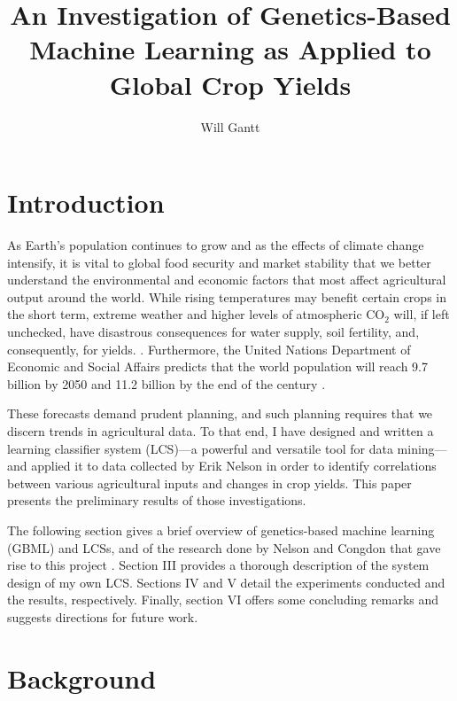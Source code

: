 \documentclass[11pt]{article}
\begin{document}
\title{An Investigation of Genetics-Based Machine Learning as Applied to Global Crop Yields}
\author{Will Gantt}
\maketitle

\section{Introduction}

As Earth's population continues to grow and as the effects of climate change intensify, it is vital to global food security and market stability that we better understand the environmental and economic factors that most affect agricultural output around the world. While rising temperatures may benefit certain crops in the short term, extreme weather and higher levels of atmospheric $\text{CO}_2$ will, if left unchecked,  have disastrous consequences for water supply, soil fertility, and, consequently, for yields. \cite{us_epa_climate_2017}. Furthermore, the United Nations Department of Economic and Social Affairs predicts that the world population will reach 9.7 billion by 2050 and 11.2 billion by the end of the century \cite{noauthor_world_2015}.

These forecasts demand prudent planning, and such planning requires that we discern trends in agricultural data. To that end, I have designed and written a learning classifier system (LCS)---a powerful and versatile tool  for data mining---and applied it to data collected by Erik Nelson in order to identify correlations between various agricultural inputs and changes in crop yields.
This paper presents the preliminary results of those investigations.

The following section gives a brief overview of genetics-based machine learning (GBML) and LCSs, and of the research done by Nelson and Congdon that gave rise to this project \cite{nelson_measuring_2016}. Section III provides a thorough description of the system design of my own LCS. Sections IV and V detail the experiments conducted and the results, respectively. Finally, section VI offers some concluding remarks and suggests directions for future work.

\section{Background}
\end{document}
